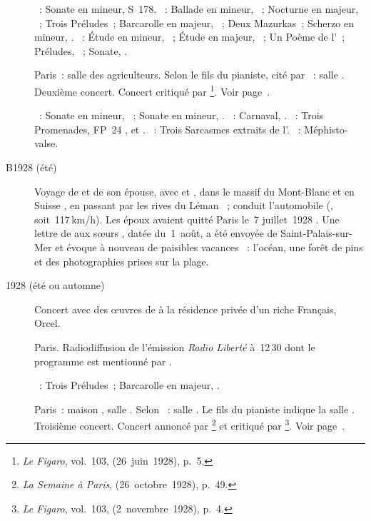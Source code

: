 \begin{description}
 \textsc{\Liszt{}}~: Sonate en \kB mineur, S~178.
 \textsc{\Chopin{}}~: Ballade en \kG mineur, ~; Nocturne en \kF
 majeur,  ~; Trois Préludes~; Barcarolle en \kF \Sharp
 majeur, ~; Deux Mazurkas~; Scherzo en \kB \Flat mineur, .
 \textsc{\Scriabine{}}~: Étude en \kD \Sharp mineur,  ~;
 Étude en \kD \Flat majeur,  ~; Un Poème de l'~;
 Préludes, ~; Sonate, .
 \item[\DateWithWeekDay{1928-06-25}]
 Paris~: salle des agriculteurs.
 Selon le fils du pianiste, cité par \citet[p.~400]{Scriabine}~: salle
 \Chopin{}.
 Deuxième concert.
 Concert critiqué par \citeauthor{Golestan28a}%
 \footnote{\emph{Le Figaro}, vol.~103,  (26~juin~1928), p.~5.}.
 Voir page~\pageref{rec:Paris2}.

 \textsc{\Beethoven{}}~: Sonate en \kC \Sharp mineur,  ~;
 Sonate en \kF mineur, .
 \textsc{\Schumann{}}~: Carnaval, .
 \textsc{\Poulenc{}}~: Trois Promenades, FP~24 ,  et
 .
 \textsc{\Prokofiev{}}~: Trois Sarcasmes extraits de l'.
 \textsc{\Liszt{}}~: Méphisto-valse.
 \item[B1928 (été)]
 Voyage de \VSofronitsky{} et de son épouse, avec \VDukelsky{} et
 \SProkofiev{}, dans le massif du Mont-Blanc \citep[voir][p.~400]{Scriabine}
 et en Suisse \citep[voir][p.~58]{Juban}, en passant par les rives du Léman
 \citep[voir][p.~150]{Nekrasova08}~; \Prokofiev{} conduit l'automobile
 (, soit~117\,km/h).
 Les époux \Sofronitsky{} avaient quitté Paris le~7 juillet~1928
 \citep[voir][p.~366]{NikonovichScriabine08}.
 Une lettre de \Sofronitsky{} aux sœurs \Vizel{}, datée du~1\ier{}~août, a
 été envoyée de Saint-Palais-sur-Mer et évoque à nouveau de paisibles
 vacances \citep[voir][p.~150]{Nekrasova08}~: l'océan, une forêt de pins et
 des photographies prises sur la plage.
 \item[1928 (été ou automne)]
 Concert avec des œuvres de \Prokofiev{} à la résidence privée d'un riche
 Français, Orcel.
 \item[\DateWithWeekDay{1928-10-26}]
 Paris.
 Radiodiffusion de l'émission \emph{Radio Liberté} à~12\,30 dont
 le programme est mentionné par \citet{liberte1928-10-26}.

 \textsc{\Chopin{}}~: Trois Préludes~; Barcarolle en \kF \Sharp majeur,
 .
 \item[\DateWithWeekDay{1928-10-29}]
 Paris~: maison \Pleyel{}, salle \Chopin{}.
 Selon \citet[p.~401]{Scriabine}~: salle \Debussy{}.
 Le fils du pianiste indique la salle \Chopin{}.
 Troisième concert.
 Concert annoncé par \citeauthor{CarolBerard}%
 \footnote{\emph{La Semaine à Paris},  (26~octobre~1928),
 p.~49.}
 et critiqué par \citeauthor{Golestan28b}%
 \footnote{\emph{Le Figaro}, vol.~103,  (2~novembre~1928),
 p.~4.}.
 Voir page~\pageref{rec:Paris3}.


\end{description}
